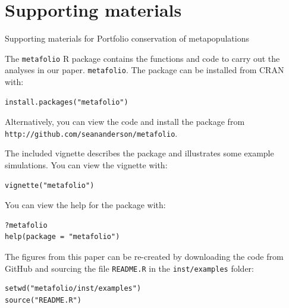 \chapter{Supporting materials}{Supporting materials for Portfolio conservation of metapopulations}


\noindent
The \texttt{metafolio} \textsf{R} package contains the functions and
code to carry out the analyses in our paper. \texttt{metafolio}. The
package can be installed from CRAN with:

\begin{verbatim}
install.packages("metafolio")
\end{verbatim}

\noindent
Alternatively, you can view the code and install the package from\\
\texttt{http://github.com/seananderson/metafolio}.

\noindent
The included vignette describes the package and illustrates some example
simulations. You can view the vignette with:

\begin{verbatim}
vignette("metafolio")
\end{verbatim}

\noindent
You can view the help for the package with:

\begin{verbatim}
?metafolio
help(package = "metafolio")
\end{verbatim}

\noindent
The figures from this paper can be re-created by downloading the code
from GitHub and sourcing the file \texttt{README.R} in the
\texttt{inst/examples} folder:

\begin{verbatim}
setwd("metafolio/inst/examples")
source("README.R")
\end{verbatim}

\clearpage




\clearpage





